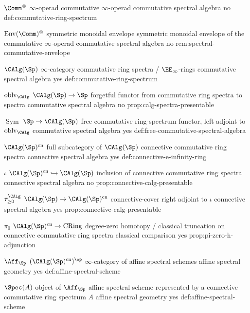 \begin{longtable}
\CanonicalEntry
{\(\Comm^\otimes\)}
{\(\infty\)-operad}
{commutative \(\infty\)-operad}
{commutative spectral algebra}
{no}
{def:commutative-ring-spectrum}

\CanonicalEntry
{\(\operatorname{Env}(\Comm)^\otimes\)}
{symmetric monoidal envelope}
{symmetric monoidal envelope of the commutative \(\infty\)-operad}
{commutative spectral algebra}
{no}
{rem:spectral-commutative-envelope}

\CanonicalEntry
{\(\CAlg(\Sp)\)}
{\(\infty\)-category}
{commutative ring spectra / \(\EE_\infty\)-rings}
{commutative spectral algebra}
{yes}
{def:commutative-ring-spectrum}

\CanonicalEntry
{\(\operatorname{oblv}_{\CAlg}\)}
{\(\CAlg(\Sp)\to\Sp\)}
{forgetful functor from commutative ring spectra to spectra}
{commutative spectral algebra}
{no}
{prop:calg-spectra-presentable}

\CanonicalEntry
{\(\operatorname{Sym}\)}
{\(\Sp\to\CAlg(\Sp)\)}
{free commutative ring-spectrum functor, left adjoint to \(\operatorname{oblv}_{\CAlg}\)}
{commutative spectral algebra}
{yes}
{def:free-commutative-spectral-algebra}

\CanonicalEntry
{\(\CAlg(\Sp)^{\mathrm{cn}}\)}
{full subcategory of \(\CAlg(\Sp)\)}
{connective commutative ring spectra}
{connective spectral algebra}
{yes}
{def:connective-e-infinity-ring}

\CanonicalEntry
{\(\iota\)}
{\(\CAlg(\Sp)^{\mathrm{cn}}\hookrightarrow\CAlg(\Sp)\)}
{inclusion of connective commutative ring spectra}
{connective spectral algebra}
{no}
{prop:connective-calg-presentable}

\CanonicalEntry
{\(\tau_{\geq0}^{\CAlg}\)}
{\(\CAlg(\Sp)\to\CAlg(\Sp)^{\mathrm{cn}}\)}
{connective-cover right adjoint to \(\iota\)}
{connective spectral algebra}
{yes}
{prop:connective-calg-presentable}

\CanonicalEntry
{\(\pi_0\)}
{\(\CAlg(\Sp)^{\mathrm{cn}}\to\operatorname{CRing}\)}
{degree-zero homotopy / classical truncation on connective commutative ring spectra}
{classical comparison}
{yes}
{prop:pi-zero-h-adjunction}

\CanonicalEntry
{\(\Aff_{\Sp}\)}
{\((\CAlg(\Sp)^{\mathrm{cn}})^{\op}\)}
{\(\infty\)-category of affine spectral schemes}
{affine spectral geometry}
{yes}
{def:affine-spectral-scheme}

\CanonicalEntry
{\(\Spec(A)\)}
{object of \(\Aff_{\Sp}\)}
{affine spectral scheme represented by a connective commutative ring spectrum \(A\)}
{affine spectral geometry}
{yes}
{def:affine-spectral-scheme}


\end{longtable}
